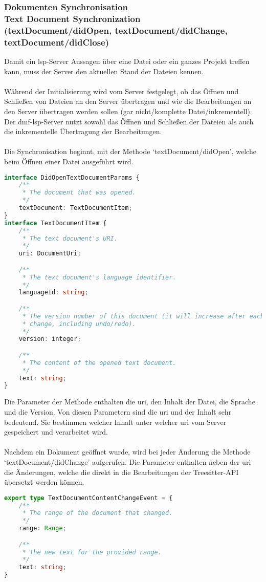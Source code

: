 \documentclass[./einleitung.tex]{subfiles}
\begin{document}
    \subsubsection[Dokumenten Synchronisation]{Dokumenten Synchronisation\\ {\textnormal{\footnotesize Text Document Synchronization \\ (textDocument/didOpen, textDocument/didChange, textDocument/didClose) \cite{dokumente}}}}\label{subsubsec:dokumenten-synchronisation}
    Damit ein \acrshort{lsp}-Server Aussagen über eine Datei oder ein ganzes Projekt treffen kann, muss der Server den aktuellen Stand der Dateien kennen.
    \\\\
    Während der Initialisierung wird vom Server festgelegt, ob das Öffnen und Schließen von Dateien an den Server übertragen und wie die Bearbeitungen an den Server übertragen werden sollen (gar nicht/komplette Datei/inkrementell).
    Der \acrshort{dmf}-\acrshort{lsp}-Server nutzt sowohl das Öffnen und Schließen der Dateien als auch die inkrementelle Übertragung der Bearbeitungen.
    \\\\
    Die Synchronisation beginnt, mit der Methode `textDocument/didOpen', welche beim Öffnen einer Datei ausgeführt wird.
    \begin{lstlisting}[language=Typescript,title=Definition der Parameter \cite{dokumente}, label=lst:dokumenteParams]
interface DidOpenTextDocumentParams {
	/**
	 * The document that was opened.
	 */
	textDocument: TextDocumentItem;
}
interface TextDocumentItem {
	/**
	 * The text document's URI.
	 */
	uri: DocumentUri;

	/**
	 * The text document's language identifier.
	 */
	languageId: string;

	/**
	 * The version number of this document (it will increase after each
	 * change, including undo/redo).
	 */
	version: integer;

	/**
	 * The content of the opened text document.
	 */
	text: string;
}
    \end{lstlisting}
    Die Parameter der Methode enthalten die \acrfull{uri}, den Inhalt der Datei, die Sprache und die Version.
    Von diesen Parametern sind die \acrshort{uri} und der Inhalt sehr bedeutend.
    Sie bestimmen welcher Inhalt unter welcher \acrshort{uri} vom Server gespeichert und verarbeitet wird.
    \\\\
    Nachdem ein Dokument geöffnet wurde, wird bei jeder Änderung die Methode `textDocument/didChange' aufgerufen.
    Die Parameter enthalten neben der \acrshort{uri} die Änderungen, welche die direkt in die Bearbeitungen der Treesitter-API übersetzt werden können.
    \begin{lstlisting}[language=Typescript, title=Definition der Bearbeitungen (ohne irrelevante Elemente)\cite{dokumente}, label=lst:dokumenteBearbeitung]
export type TextDocumentContentChangeEvent = {
	/**
	 * The range of the document that changed.
	 */
	range: Range;

	/**
	 * The new text for the provided range.
	 */
	text: string;
}
    \end{lstlisting}
\end{document}

